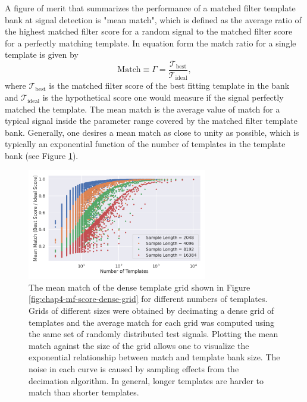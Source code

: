 A figure of merit that summarizes the performance of a matched filter template bank at signal detection is "mean match", which is defined as the average ratio of the highest matched filter score for a random signal to the matched filter score for a perfectly matching template. In equation form the match ratio for a single template is given by
\begin{equation}
    \textrm{Match}\equiv\Gamma=\frac{\mathcal{T}_\mathrm{best}}{\mathcal{T}_\textrm{ideal}},
\end{equation}
where $\mathcal{T}_\textrm{best}$ is the matched filter score of the best fitting template in the bank and $\mathcal{T}_\textrm{ideal}$ is the hypothetical score one would measure if the signal perfectly matched the template. The mean match is the average value of match for a typical signal inside the parameter range covered by the matched filter template bank. Generally, one desires a mean match as close to unity as possible, which is typically an exponential function of the number of templates in the template bank (see Figure \ref{fig:chap4-mean-match-dense-grid}).
\begin{figure}[htbp]
    \centering
    \includegraphics*[width=0.7\textwidth]{figs/Chapter-4/220114_mean_match_vs_number_of_templates_87.0_0cm_modify_sample_number.png}
    \caption{\label{fig:chap4-mean-match-dense-grid} The mean match of the dense template grid shown in Figure \ref{fig:chap4-mf-score-dense-grid} for different numbers of templates. Grids of different sizes were obtained by decimating a dense grid of templates and the average match for each grid was computed using the same set of randomly distributed test signals. Plotting the mean match against the size of the grid allows one to visualize the exponential relationship between match and template bank size. The noise in each curve is caused by sampling effects from the decimation algorithm. In general, longer templates are harder to match than shorter templates.}
\end{figure}

